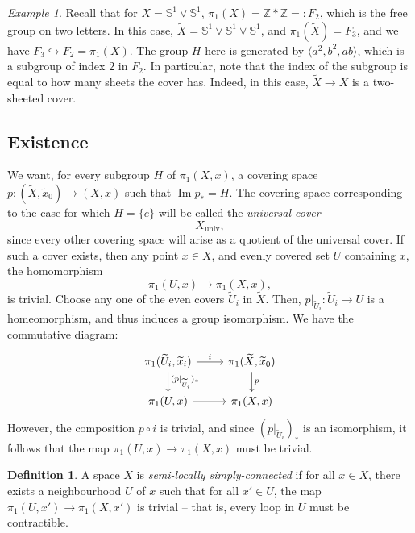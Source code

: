 \documentclass[a4paper]{report}
\theoremstyle{definition}
\newtheorem{definition}{Definition}
\theoremstyle{remark}
\theoremstyle{proposition}
\theoremstyle{conjecture}
\theoremstyle{lemma}
\theoremstyle{corollary}
\theoremstyle{exercise}
\newtheorem{example}{Example}
\newcommand{\on}{\operatorname}
\begin{document}
\begin{example}
    Recall that for $X = \mathbb{S}^1 \vee \mathbb{S}^1$,
    $\pi_1(X) = \mathbb{Z} \ast \mathbb{Z} =: F_2$,
    which is the free group on two letters. 
    In this case, $\widetilde{X} = \mathbb{S}^1 \vee \mathbb{S}^1 \vee \mathbb{S}^1$,
    and $\pi_1(\widetilde{X}) = F_3$, and we have $F_3 \hookrightarrow F_2 = \pi_1(X)$.
    The group $H$ here is generated by $\langle a^2,b^2,ab\rangle$, which is a 
    subgroup of index $2$ in $F_2$. In particular, note that the index of the 
    subgroup is equal to how many sheets the cover has. Indeed, in this case, 
    $\widetilde{X} \to X$ is a two-sheeted cover.
\end{example}

\subsection{Existence}

We want, for every subgroup $H$ of $\pi_1(X,x)$, a covering space 
$p : (\widetilde{X}, \widetilde{x}_0) \to (X,x)$ such that 
$\on{Im}p_\ast = H$. The covering space corresponding to the case for which 
$H = \lbrace e\rbrace$ will be called the \emph{universal cover} 
$$X_{\on{univ}},$$ 
since every other covering space will arise as a quotient of the universal cover.
If such a cover exists, then any point $x\in X$, and evenly covered set $U$ 
containing $x$, the homomorphism 
$$\pi_1(U,x) \longrightarrow \pi_1(X,x),$$ is trivial. Choose any one of the 
even covers $\widetilde{U}_i$ in $\widetilde{X}$. Then, $p\vert_{\widetilde{U}_i} : \widetilde{U}_i \to U$
is a homeomorphism, and thus induces a group isomorphism.
We have the commutative diagram:
$$\begin{tikzcd}
    {\pi_1(\widetilde{U}_i,\widetilde{x}_i)} \arrow[r, "i"] \arrow[d, "(p\vert_{\widetilde{U}_i})_\ast"] & {\pi_1(\widetilde{X},\widetilde{x}_0)} \arrow[d, "p"] \\
    {\pi_1(U,x)} \arrow[r]                                                                               & {\pi_1(X,x)}                                         
\end{tikzcd}$$
However, the composition $p\circ i$ is trivial, and since $(p\vert_{\widetilde{U}_i})_\ast$ 
is an isomorphism, it follows that the map $\pi_1(U,x) \to \pi_1(X,x)$ must be trivial.

\begin{definition}
    A space $X$ is \emph{semi-locally simply-connected} if for all $x\in X$, 
    there exists a neighbourhood $U$ of $x$ such that for all $x' \in U$, 
    the map $\pi_1(U,x') \to \pi_1(X,x')$ is trivial -- that is, every loop in 
    $U$ must be contractible.
\end{definition} 
\end{document}
